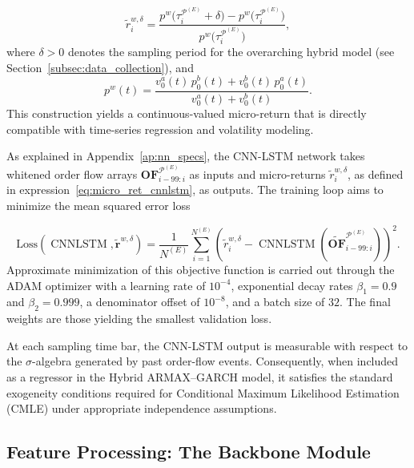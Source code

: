 \documentclass[10pt,a4paper,oneside]{article}
\DeclareMathOperator{\cnnlstm}{CNNLSTM}
\begin{document}
\begin{equation}
    \tilde{r}^{w, \delta}_{i}
    =
    \frac{p^w\bigl(\tau^{\mathcal{P}^{(E)}}_i + \delta\bigr) - p^w\bigl(\tau^{\mathcal{P}^{(E)}}_i\bigr)}
    {p^w\bigl(\tau^{\mathcal{P}^{(E)}}_i\bigr)},
    \label{eq:micro_ret_cnnlstm}
\end{equation}
where $\delta > 0$ denotes the sampling period for the overarching hybrid model (see Section~\ref{subsec:data_collection}), and
\[
    p^w(t)
    =
    \frac{v^a_0(t)\,p^b_0(t) + v^b_0(t)\,p^a_0(t)}
    {v^a_0(t) + v^b_0(t)}.
\]
This construction yields a continuous-valued micro-return that is directly compatible with time-series regression and volatility modeling.

As explained in Appendix~\ref{ap:nn_specs}, the CNN-LSTM network takes whitened order flow arrays $\mathbf{OF}^{\mathcal{P}^{(E)}}_{i - 99:i}$ as inputs and micro-returns $\tilde{r}_i^{w, \delta}$, as defined in expression~\eqref{eq:micro_ret_cnnlstm}, as outputs. The training loop aims to minimize the mean squared error loss

\[
    \text{Loss}(\cnnlstm, \tilde{\mathbf{r}}^{w, \delta})
    =
    \frac{1}{N^{(E)}}
    \sum_{i=1}^{N^{(E)}}
    \left(\tilde{r}_i^{w, \delta} - \cnnlstm\left(\widetilde{\mathbf{OF}}^{\mathcal{P}^{(E)}}_{i - 99:i} \right)\right)^2.
\]
Approximate minimization of this objective function is carried out through the ADAM optimizer \cite{kingma2014adam} with a learning rate of \(10^{-4}\), exponential decay rates \(\beta_1 = 0.9\) and \(\beta_2 = 0.999\), a denominator offset of \(10^{-8}\), and a batch size of \(32\). The final weights are those yielding the smallest validation loss.

At each sampling time bar, the CNN-LSTM output is measurable with respect to the $\sigma$-algebra generated by past order-flow events. Consequently, when included as a regressor in the Hybrid ARMAX–GARCH model, it satisfies the standard exogeneity conditions required for Conditional Maximum Likelihood Estimation (CMLE) under appropriate independence assumptions.

\subsection{Feature Processing: The Backbone Module}
\label{subsec:feature_extraction}
\end{document}
